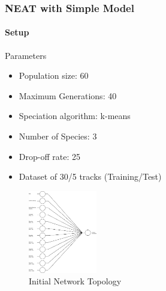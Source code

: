 \documentclass[8pt]{beamer}
\begin{document}
\begin{frame}
	\frametitle{NEAT with Simple Model}
	\framesubtitle{Setup}
	\begin{block}{Parameters}
		\begin{itemize}
			\item Population size: 60
			\item Maximum Generations: 40
			\item Speciation algorithm: k-means
			\item Number of Species: 3
			\item Drop-off rate: 25
			\item Dataset of 30/5 tracks (Training/Test)
		\end{itemize}
	\end{block}
	\begin{figure}[c]	
		\includegraphics[width=3cm]{images/topology.jpeg}
		\caption{Initial Network Topology}
	\end{figure}
\end{frame}
\end{document}
